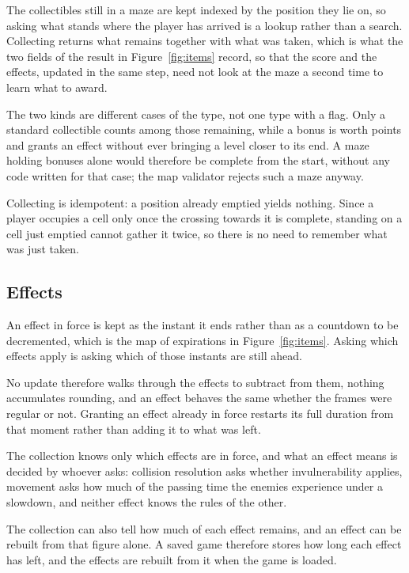 The collectibles still in a maze are kept indexed by the position they lie on, so asking what stands where the player has arrived
is a lookup rather than a search. Collecting returns what remains together with what was taken, which is what the two
fields of the result in Figure~\ref{fig:items} record, so that the score and the effects, updated in the same step, need not look at the maze a second time to learn what to award.

The two kinds are different cases of the type, not one type with a flag. Only a standard collectible counts among those
remaining, while a bonus is worth points and grants an effect without ever bringing a level closer to its end. A maze
holding bonuses alone would therefore be complete from the start, without any code written for that case; the map validator rejects such a maze anyway.

Collecting is idempotent: a position already emptied yields nothing. Since a player occupies a cell only once the
crossing towards it is complete, standing on a cell just emptied cannot gather it twice, so there is no need to remember what was just taken.

\subsection{Effects}
An effect in force is kept as the instant it ends rather than as a countdown to be decremented, which is the map of
expirations in Figure~\ref{fig:items}. Asking which effects apply is asking which of those instants are still ahead.

No update therefore walks through the effects to subtract from them, nothing accumulates rounding, and an effect
behaves the same whether the frames were regular or not. Granting an effect already in force restarts its full duration from that moment rather than adding it to what was left.

The collection knows only which effects are in force, and what an effect means is decided by whoever asks: collision
resolution asks whether invulnerability applies, movement asks how much of the passing time the enemies experience
under a slowdown, and neither effect knows the rules of the other.

The collection can also tell how much of each effect remains, and an effect can be rebuilt from that figure alone. A saved game therefore stores how long each effect has left, and the effects are rebuilt from it when the game is loaded.


